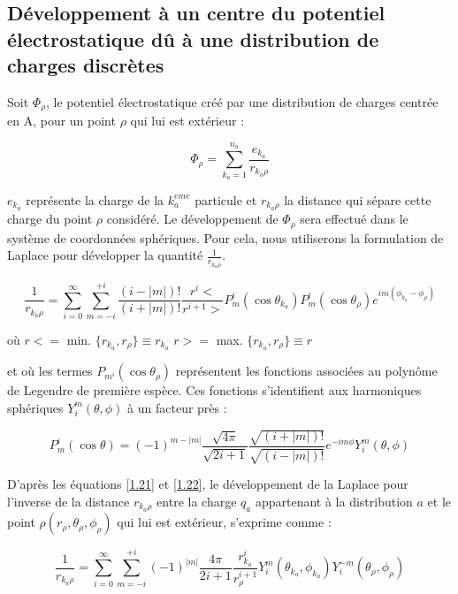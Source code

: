 	\subsection{Développement à un centre du potentiel électrostatique dû à une distribution de charges discrètes}  
	
	Soit $\Phi_{\rho}$, le potentiel électrostatique créé par une distribution de charges centrée en A, pour un point $\rho$ qui lui est extérieur : 
	
	\begin{equation}
	\Phi_{\rho} = \sum_{k_{a}=1}^{n_{a}} \frac{e_{k_{a}}}{r_{k_{a}\rho}} \label{1.20}
	\end{equation}
	
	$e_{k_{a}}$ représente la charge de la $k_{a}^{eme}$ particule et $r_{k_{a}\rho}$ la distance qui sépare cette charge du point $\rho$ considéré. Le développement de $\Phi_{\rho}$ sera effectué dans le système de coordonnées sphériques. Pour cela, nous utiliserons la formulation de Laplace pour développer la quantité $\frac{1}{r_{k_{a}\rho}}$.
	
	\begin{equation}
	\frac{1}{r_{k_{a}\rho}} = \sum_{i=0}^{\infty} \sum_{m=-i}^{+i} \frac{(i-|m|)!}{(i+ |m|)!} \frac{r^{i}<}{r^{i+1}>} P_{m}^{i} (\cos\theta_{k_{a}}) P^{i}_{m}(\cos\theta_{\rho})e^{im(\phi_{k_{a}}- \phi_{\rho})} \label{1.21}
	\end{equation}
	
	où $r< =$ min. $\{r_{k_{a}}, r_{\rho}\} \equiv r_{k_{a}}$
	$r> =$ max. $\{r_{k_{a}}, r_{\rho}\} \equiv r$
	
	et où les termes $P_{m^{i}} (\cos\theta_{\rho})$ représentent les fonctions associées au polynôme de Legendre de première espèce. Ces fonctions s'identifient aux harmoniques sphériques $Y_{i}^{m}(\theta,\phi)$ à un facteur près : 
	
	\begin{equation}
	P_{m}^{i}(\cos\theta) = (-1)^{m-|m|} \frac{\sqrt{4\pi}}{\sqrt{2i+ 1}} \frac{\sqrt{(i+ |m|)!}}{\sqrt{(i-|m|)!}} e^{-im\phi} Y_{i}^{m}(\theta,\phi) \label{1.22}
	\end{equation}
	
	D'après les équations \ref{1.21} et \ref{1.22}, le développement de la Laplace pour l'inverse de la distance $r_{k_{a}\rho}$ entre la charge $q_{a}$ appartenant à la distribution $a$ et le point $\rho(r_{\rho}, \theta_{\rho}, \phi_{\rho})$ qui lui est extérieur, s'exprime comme : 
	
	\begin{equation}
	\frac{1}{r_{k_{a}\rho}} = \sum_{i=0}^{\infty} \sum_{m=-i}^{+i} (-1)^{|m|} \frac{4\pi}{2i +1} \frac{r_{k_{a}}^{i}}{r_{\rho}^{i+1}} Y^{m}_{i} (\theta_{k_{a}}, \phi_{k_{a}}) Y_{i}^{-m} (\theta_{\rho},\phi_{\rho})  \label{1.23}
	\end{equation}
	
